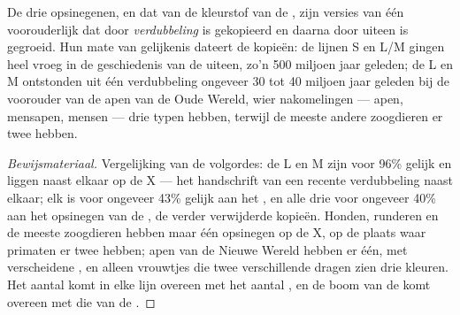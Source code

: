 \begin{proposition}\label{prop:g11:the-eye:family}
De drie opsinegenen, en dat van de kleurstof van de , zijn versies
van één voorouderlijk  dat door \emph{verdubbeling} is gekopieerd en
daarna door  uiteen is gegroeid. Hun mate van gelijkenis dateert de
kopieën: de lijnen S en L/M gingen heel vroeg in de geschiedenis van de
 uiteen, zo'n 500 miljoen jaar geleden; de  L en M
ontstonden uit één verdubbeling ongeveer 30 tot 40 miljoen jaar geleden bij
de voorouder van de apen van de Oude Wereld, wier nakomelingen --- apen,
mensapen, mensen --- drie typen  hebben, terwijl de meeste
andere zoogdieren er twee hebben.
\end{proposition}
\begin{proof}[Bewijsmateriaal]
Vergelijking van de volgordes: de  L en M zijn voor 96\% gelijk en
liggen naast elkaar op de X --- het handschrift van een recente
verdubbeling naast elkaar; elk is voor ongeveer 43\% gelijk aan het ,
en alle drie voor ongeveer 40\% aan het opsinegen van de , de
verder verwijderde kopieën. Honden, runderen en de meeste zoogdieren
hebben maar één opsinegen op de X, op de plaats waar primaten er twee
hebben; apen van de Nieuwe Wereld hebben er één, met verscheidene ,
en alleen vrouwtjes die twee verschillende  dragen zien drie
kleuren. Het aantal  komt in elke lijn overeen met het aantal
, en de boom van de  komt overeen met die van de .
\end{proof}

